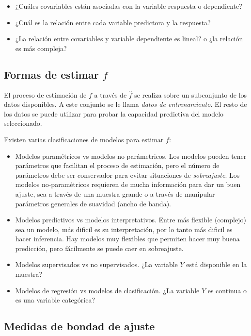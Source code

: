 \documentclass[
  12pt,
]{book}
\providecommand{\tightlist}{%
  \setlength{\itemsep}{0pt}\setlength{\parskip}{0pt}}
\begin{document}
\begin{itemize}
\tightlist
\item
  ¿Cuáles covariables están asociadas con la variable respuesta o
  dependiente?
\item
  ¿Cuál es la relación entre cada variable predictora y la respuesta?
\item
  ¿La relación entre covariables y variable dependiente es lineal? o ¿la
  relación es más compleja?
\end{itemize}

\hypertarget{formas-de-estimar-f}{%
\subsection{\texorpdfstring{Formas de estimar
\(f\)}{Formas de estimar f}}\label{formas-de-estimar-f}}

El proceso de estimación de \(f\) a través de \(\hat f\) se realiza
sobre un subconjunto de los datos disponibles. A este conjunto se le
llama \emph{datos de entrenamiento}. El resto de los datos se puede
utilizar para probar la capacidad predictiva del modelo seleccionado.

Existen varias clasificaciones de modelos para estimar \(f\):

\begin{itemize}
\tightlist
\item
  Modelos paramétricos vs modelos no parámetricos. Los modelos pueden
  tener parámetros que facilitan el proceso de estimación, pero el
  número de parámetros debe ser conservador para evitar situaciones de
  \emph{sobreajuste}. Los modelos no-paramétricos requieren de mucha
  información para dar un buen ajuste, sea a través de una muestra
  grande o a través de manipular parámetros generales de suavidad (ancho
  de banda).
\item
  Modelos predictivos vs modelos interpretativos. Entre más flexible
  (complejo) sea un modelo, más dificil es su interpretación, por lo
  tanto más dificil es hacer inferencia. Hay modelos muy flexibles que
  permiten hacer muy buena predicción, pero fácilmente se puede caer en
  sobreajuste.
\item
  Modelos supervisados vs no supervisados. ¿La variable \(Y\) está
  disponible en la muestra?
\item
  Modelos de regresión vs modelos de clasificación. ¿La variable \(Y\)
  es continua o es una variable categórica?
\end{itemize}

\hypertarget{medidas-de-bondad-de-ajuste}{%
\subsection{Medidas de bondad de
ajuste}\label{medidas-de-bondad-de-ajuste}}
\end{document}
